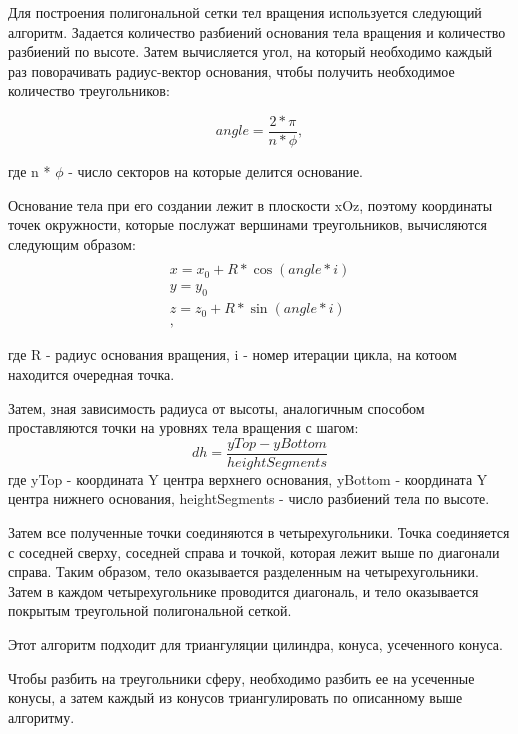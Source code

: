 Для построения полигональной сетки тел вращения используется следующий алгоритм.
Задается количество разбиений основания тела вращения и количество разбиений по высоте. Затем вычисляется угол, на который необходимо каждый раз поворачивать радиус-вектор основания, чтобы получить необходимое количество треугольников:

\begin{equation}
	angle = \frac{2 * \pi}{n * \phi}	,
\end{equation} 

где n * $\phi$ - число секторов на которые делится основание.


Основание тела при его создании лежит в плоскости xOz, поэтому координаты точек окружности, которые послужат вершинами треугольников, вычисляются следующим образом:
\begin{multline}
	\\
	x = x_0 + R * \cos(angle * i)\\
	y = y_0\\
	z = z_0 + R * \sin(angle * i) \\ ,
\end{multline}

где R - радиус основания вращения, i - номер итерации цикла, на котоом находится очередная точка.

\begin{figure}[ht!]
\end{figure}


Затем, зная зависимость радиуса от высоты, аналогичным способом проставляются точки на уровнях тела вращения с шагом:
\begin{equation}
	dh = \frac{yTop - yBottom}{heightSegments}
\end{equation}
где yTop - координата Y центра верхнего основания, yBottom - координата Y центра нижнего основания, heightSegments - число разбиений тела по высоте.

Затем  все полученные точки соединяются в четырехугольники. Точка соединяется с соседней сверху, соседней справа и точкой, которая лежит выше по диагонали справа. Таким образом, тело оказывается разделенным на четырехугольники. Затем  в каждом четырехугольнике проводится диагональ, и тело оказывается покрытым треугольной полигональной сеткой.

Этот алгоритм подходит для триангуляции цилиндра, конуса, усеченного конуса.

Чтобы разбить на треугольники сферу, необходимо разбить ее на усеченные конусы, а затем каждый из конусов триангулировать по описанному выше алгоритму.


